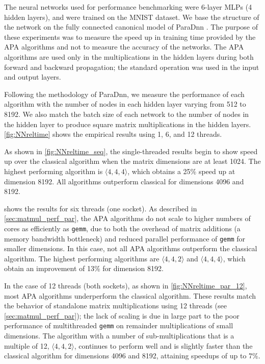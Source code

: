 \documentclass[sigconf,review,anonymous]{acmart}
\newcommand{\dims}[1]{\langle #1 \rangle}
\begin{document}
The neural networks used for performance benchmarking were 6-layer MLPs (4 hidden layers), and were trained on the MNIST dataset. 
We base the structure of the network on the fully connected canonical model of ParaDnn \cite{WWB20}.
The purpose of these experiments was to measure the speed up in training time provided by the APA algorithms and not to measure the accuracy of the networks. 
The APA algorithms are used only in the multiplications in the hidden layers during both forward and backward propagation; the standard operation was used in the input and output layers. 

Following the methodology of ParaDnn, we measure the performance of each algorithm with the number of nodes in each hidden layer varying from 512 to 8192. 
We also match the batch size of each network to the number of nodes in the hidden layer to produce square matrix multiplications in the hidden layers. 
\cref{fig:NNreltime} shows the empirical results using 1, 6, and 12 threads.

As shown in \cref{fig:NNreltime_seq}, the single-threaded results begin to show speed up over the classical algorithm when the matrix dimensions are at least 1024.
The highest performing algorithm is $\dims{4,4,4}$, which obtains a 25\% speed up at dimension 8192. 
All algorithms outperform classical for dimensions 4096 and 8192.

 shows the results for six threads (one socket).
As described in \cref{sec:matmul_perf_par}, the APA algorithms do not scale to higher numbers of cores as efficiently as \texttt{gemm}, due to both the overhead of matrix additions (a memory bandwidth bottleneck) and reduced parallel performance of \texttt{gemm} for smaller dimensions.
In this case, not all APA algorithms outperform the classical algorithm.
The highest performing algorithms are $\dims{4,4,2}$ and $\dims{4,4,4}$, which obtain an improvement of 13\% for dimension 8192.

In the case of 12 threads (both sockets), as shown in \cref{fig:NNreltime_par_12}, most APA algorithms underperform the classical algorithm.
These results match the behavior of standalone matrix multiplications using 12 threads (see \cref{sec:matmul_perf_par}); the lack of scaling is due in large part to the poor performance of multithreaded \texttt{gemm} on remainder multiplications of small dimensions.
The algorithm with a number of sub-multiplications that is a multiple of 12, $\dims{4,4,2}$, continues to perform well and is slightly faster than the classical algorithm for dimensions 4096 and 8192, attaining speedups of up to 7\%.
\end{document}
